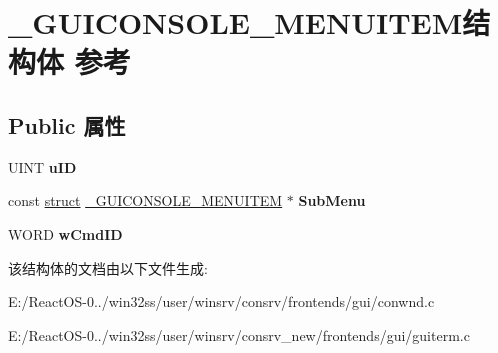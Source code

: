 \hypertarget{struct___g_u_i_c_o_n_s_o_l_e___m_e_n_u_i_t_e_m}{}\section{\+\_\+\+G\+U\+I\+C\+O\+N\+S\+O\+L\+E\+\_\+\+M\+E\+N\+U\+I\+T\+E\+M结构体 参考}
\label{struct___g_u_i_c_o_n_s_o_l_e___m_e_n_u_i_t_e_m}
\subsection*{Public 属性}
\begin{DoxyCompactItemize}
\item 
\mbox{\label{struct___g_u_i_c_o_n_s_o_l_e___m_e_n_u_i_t_e_m_aacc989cee7cfa22997c541f47f11f4eb}} 
U\+I\+NT {\bfseries u\+ID}
\item 
\mbox{\label{struct___g_u_i_c_o_n_s_o_l_e___m_e_n_u_i_t_e_m_acdc120ee2a21efb6b09bbdc1160da095}} 
const \hyperlink{interfacestruct}{struct} \hyperlink{struct___g_u_i_c_o_n_s_o_l_e___m_e_n_u_i_t_e_m}{\+\_\+\+G\+U\+I\+C\+O\+N\+S\+O\+L\+E\+\_\+\+M\+E\+N\+U\+I\+T\+EM} $\ast$ {\bfseries Sub\+Menu}
\item 
\mbox{\label{struct___g_u_i_c_o_n_s_o_l_e___m_e_n_u_i_t_e_m_a5a8dbbc7f46e251a04c36f493f6d8de3}} 
W\+O\+RD {\bfseries w\+Cmd\+ID}
\end{DoxyCompactItemize}


该结构体的文档由以下文件生成\+:\begin{DoxyCompactItemize}
\item 
E\+:/\+React\+O\+S-\/0../win32ss/user/winsrv/consrv/frontends/gui/conwnd.\+c\item 
E\+:/\+React\+O\+S-\/0../win32ss/user/winsrv/consrv\+\_\+new/frontends/gui/guiterm.\+c\end{DoxyCompactItemize}
